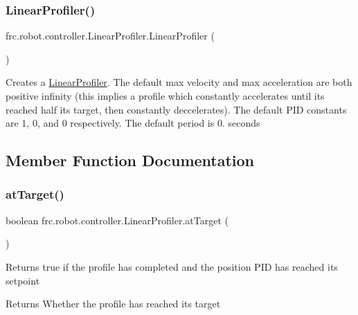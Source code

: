 \subsubsection{\texorpdfstring{LinearProfiler()}{LinearProfiler()}\hspace{0.1cm}{\footnotesize\ttfamily [4/4]}}
{\footnotesize\ttfamily frc.\+robot.\+controller.\+Linear\+Profiler.\+Linear\+Profiler (\begin{DoxyParamCaption}{ }\end{DoxyParamCaption})\hspace{0.3cm}{\ttfamily [inline]}}

Creates a \mbox{\hyperlink{classfrc_1_1robot_1_1controller_1_1_linear_profiler}{Linear\+Profiler}}. The default max velocity and max acceleration are both positive infinity (this implies a profile which constantly accelerates until its reached half its target, then constantly deccelerates). The default P\+ID constants are 1, 0, and 0 respectively. The default period is 0. seconds 

\subsection{Member Function Documentation}
\mbox{\label{classfrc_1_1robot_1_1controller_1_1_linear_profiler_ae81e47754ae53ca675d73b45fb1cf200}} 
\subsubsection{\texorpdfstring{atTarget()}{atTarget()}}
{\footnotesize\ttfamily boolean frc.\+robot.\+controller.\+Linear\+Profiler.\+at\+Target (\begin{DoxyParamCaption}{ }\end{DoxyParamCaption})\hspace{0.3cm}{\ttfamily [inline]}}

Returns true if the profile has completed and the position P\+ID has reached its setpoint

\begin{DoxyReturn}{Returns}
Whether the profile has reached its target 
\end{DoxyReturn}
\mbox{\label{classfrc_1_1robot_1_1controller_1_1_linear_profiler_aae4b5ac2aad7a19d4e632739b85ed93d}} 
